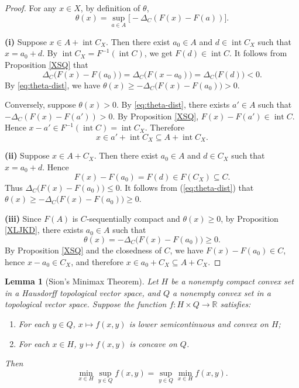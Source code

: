 \documentclass[11pt]{article}
\newtheorem{lemma}{Lemma}[section]
\begin{document}
\begin{proof}
	For any $x\in X$, by definition of $\theta$,
	\begin{equation}\label{eq:theta-dist}
		\theta(x)=\sup_{a\in A}\bigl[-\Delta_C(F(x)-F(a))\bigr].
	\end{equation}
	
	\textbf{(i)} Suppose $x\in A+\operatorname{int}C_X$. Then there exist $a_0\in A$ and $d\in\operatorname{int}C_X$ such that $x=a_0+d$. By   $\operatorname{int}C_X=F^{-1}(\operatorname{int}C)$, we get $F(d)\in\operatorname{int}C$. It follows from   Proposition \ref{XSQ} that
	$${\Delta _C}\bigl( F(x) - F(a_0) \bigr) = {\Delta _C}\bigl( F(x - a_0) \bigr) = {\Delta _C}\bigl( F(d) \bigr) < 0.$$
	By \eqref{eq:theta-dist}, we have  $\theta(x) \ge -{\Delta _C}\bigl( F(x) - F(a_0) \bigr) > 0$.
	
	Conversely, suppose $\theta(x)>0$. By \eqref{eq:theta-dist}, there exists $a' \in A$ such that
	$-\Delta_C(F(x) - F(a')) > 0$.
	By Proposition \ref{XSQ},
	$F(x) - F(a') \in \operatorname{int} C$.
	Hence
	$x - a' \in F^{-1}(\operatorname{int} C) = \operatorname{int} C_X$.
	Therefore
	$$x \in a' + \operatorname{int} C_X \subseteq A + \operatorname{int} C_X.$$
	
	\textbf{(ii)} Suppose $x\in A + C_X$. Then there exist $a_0\in A$ and $d\in C_X$ such that $x=a_0+d$. Hence
	\[
	F(x)-F(a_0)=F(d)\in F(C_X)\subseteq C.
	\]
	Thus ${\Delta _C}\bigl( F(x) - F(a_0) \bigr) \le0$.     It follows from  (\ref{eq:theta-dist})  that
	$\theta(x) \ge -{\Delta _C}\bigl( F(x) - F(a_0) \bigr) \ge 0$.
	
	\textbf{(iii)} Since $F(A)$ is $C$-sequentially compact and $\theta(x)\ge 0$, by Proposition \ref{XLJKD}, there exists $a_0 \in A$ such that
	$$\theta(x) = -{\Delta _C}\bigl( F(x) - F(a_0) \bigr) \ge 0.$$
	By Proposition \ref{XSQ} and the closedness of $C$, we have $F(x)-F(a_0) \in C$, hence $x - a_0 \in C_X$, and therefore
	$x \in a_0 + C_X \subseteq A + C_X.$
\end{proof}

 

\begin{lemma}[Sion's Minimax Theorem]\label{SJDJX}
	Let $H$ be a nonempty compact convex set in a Hausdorff topological vector space, and $Q$ a nonempty convex set in a topological vector space. Suppose the function $f : H \times Q \to \mathbb{R}$ satisfies:
	\begin{enumerate}
		\item For each $y \in Q$, $x \mapsto f(x,y)$ is lower semicontinuous and convex on $H$;
		\item For each $x \in H$, $y \mapsto f(x,y)$ is concave on $Q$.
	\end{enumerate}
	Then
	\[
	\min_{x \in H} \sup_{y \in Q} f(x,y) = \sup_{y \in Q} \min_{x \in H} f(x,y).
	\]
\end{lemma}
\end{document}
